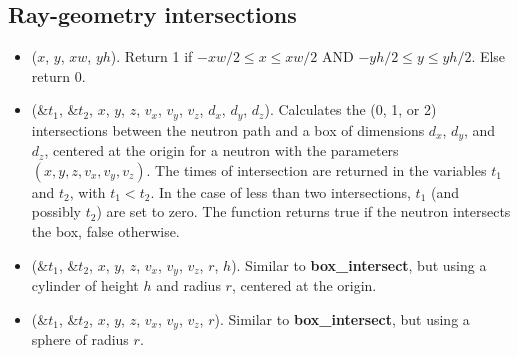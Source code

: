 \subsection{Ray-geometry intersections}
\begin{itemize}
\item {}($x$, $y$, $xw$, $yh$).
  Return 1 if $-xw/2 \leq x \leq xw/2$ AND $-yh/2 \leq y \leq yh/2$.
  Else return 0.
\item {}(\&$t_1$, \&$t_2$, $x$, $y$, $z$, $v_x$, $v_y$, $v_z$,
  $d_x$, $d_y$, $d_z$). Calculates the (0, 1, or 2) intersections between
  the neutron path and a box of dimensions $d_x$, $d_y$, and $d_z$,
  centered at the origin for a neutron with the parameters
  $(x,y,z,v_x,v_y,v_z)$. The times of intersection are returned
  in the variables $t_1$ and $t_2$, with $t_1 < t_2$. In the case
  of less than two intersections, $t_1$ (and possibly $t_2$) are set to
  zero. The function returns true if the neutron intersects the box,
  false otherwise.
\item {}(\&$t_1$, \&$t_2$, $x$, $y$, $z$, $v_x$, $v_y$, $v_z$,
  $r$, $h$).  Similar to \textbf{box\_intersect}, but using a cylinder of height $h$ and radius $r$,
  centered at the origin.
\item {}(\&$t_1$, \&$t_2$, $x$, $y$, $z$, $v_x$, $v_y$, $v_z$,
  $r$). Similar to \textbf{box\_intersect}, but using a sphere
  of radius $r$.
\end{itemize}

